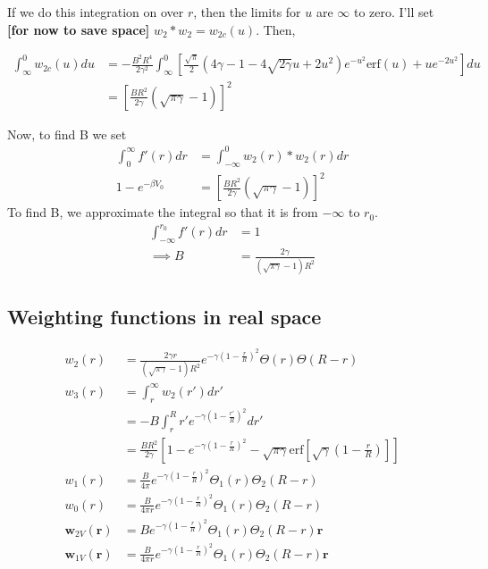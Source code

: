 \documentclass[letterpaper,twocolumn,amsmath,amssymb,prb]{revtex4-1}
\newcommand{\red}[1]{{\bf \color{red} #1}}
\newcommand{\rr}{\textbf{r}}
\newcommand{\fixme}[1]{\red{[#1]}}
\begin{document}
If we do this integration on over $r$, then the limits for $u$ are
$\infty$ to zero.  I'll set \fixme{for now to save space} $w_2\ast
w_2 = w_{2c}(u)$. Then,
\begin{widetext}
\begin{align}
\int_{\infty}^0 w_{2c}(u) du &= -\frac{B^2 R^4}{2 \gamma^2}
           \int_\infty^0 \left[ \frac{\sqrt{\pi}}{2} \left( 4\gamma - 1 -
           4\sqrt{2\gamma}u + 2 u^2 \right) e^{-u^2} \textrm{erf}(u) +
           u e^{-2u^2} \right]du \\
           &= \left[ \frac{B R^2}{2\gamma} (\sqrt{\pi \gamma} -1) \right]^2
\end{align}
\end{widetext}
Now, to find B we set
\begin{align}
  \int_0^{\infty} f'(r)dr &= \int_{-\infty}^0 w_2(r)\ast w_2(r) dr\\
   1 - e^{-\beta V_0} &= \left[ \frac{B R^2}{2\gamma} (\sqrt{\pi
      \gamma} -1)  \right]^2
 \end{align}
To find B, we approximate the integral so that it is from $-\infty$ to $r_0$.
\begin{align}
  \int_{-\infty}^{r_0} f'(r)dr &= 1 \\
  \implies B &= \frac{2\gamma}{(\sqrt{\pi \gamma}-1)R^2}
\end{align}

\subsection{Weighting functions in real space}

\begin{align}
  w_2(r) &=\frac{2\gamma r}
  {(\sqrt{\pi \gamma}-1)R^2}e^{-\gamma \left ( 1 - \frac{r}{R} \right)^2}
           \Theta(r) \Theta(R - r )\\
  w_3(r) &= \int_r^\infty w_2(r') dr'\\
         &= -B \int_r^R r' e^{-\gamma \left(1- \frac{r'}{R} \right)^2}dr'\\
         &= \frac{B R^2}{2\gamma}\left[ 1 - e^{-\gamma
      \left(1-\frac{r}{R} \right)^2} - \sqrt{\pi \gamma} \mathrm{erf} \left[
        \sqrt{\gamma} \left( 1- \frac{r}{R} \right) \right] \right]\\
  w_1(r) &= \frac{B}{4\pi}e^{-\gamma \left ( 1 - \frac{r}{R}
            \right)^2} \Theta_1(r) \Theta_2 (R - r)\\
  w_0(r) &= \frac{B}{4\pi r}e^{-\gamma \left ( 1 - \frac{r}{R}
            \right)^2} \Theta_1(r) \Theta_2 (R - r)\\
  \mathbf{w}_{2V}(\rr) &= B e^{-\gamma \left ( 1 - \frac{r}{R} \right)^2}
           \Theta_1(r) \Theta_2 (R - r) \rr\\
  \mathbf{w}_{1V}(\rr) &= \frac{B}{4\pi r} e^{-\gamma \left ( 1 - \frac{r}{R} \right)^2}
           \Theta_1(r) \Theta_2 (R - r )\rr
\end{align}
\end{document}
